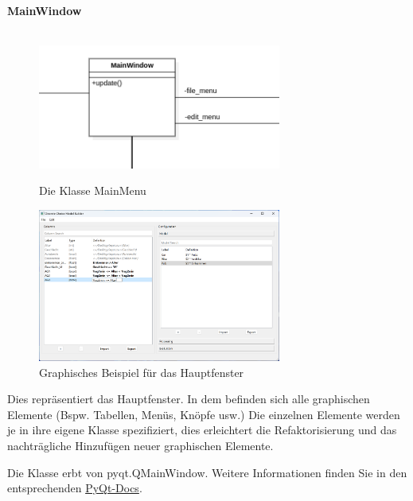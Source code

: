 \documentclass{article}
\begin{document}
\newpage
\textbf{\large{MainWindow}}\\\\
\begin{figure}[H]%
    \centering
    \begin{minipage}[b]{0.4\textwidth}
        \centering
        \includegraphics[width=8cm]{entwurf/Entwurf_dokument/img/Alissa/MainWindow.png}
        \caption{Die Klasse MainMenu}
    \end{minipage}
    \hfill
    \begin{minipage}[b]{0.4\textwidth}
        \includegraphics[width=8cm]{specifications/img/gui-screenshots/columns-editing+model.png}
        \caption{Graphisches Beispiel für das Hauptfenster}
    \end{minipage}
\end{figure}
Dies repräsentiert das Hauptfenster. In dem befinden sich alle graphischen Elemente (Bspw. Tabellen, Menüs, Knöpfe usw.) Die einzelnen Elemente werden je in ihre eigene Klasse spezifiziert, dies erleichtert die Refaktorisierung und das nachträgliche Hinzufügen neuer graphischen Elemente.

Die Klasse erbt von pyqt.QMainWindow. Weitere Informationen finden Sie in den entsprechenden \href{https://doc.qt.io/qt-6/qmainwindow.html}{PyQt-Docs}.
\newline \newline
\end{document}
